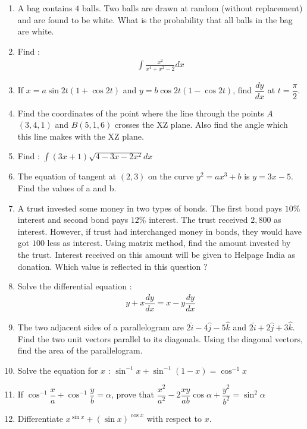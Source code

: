 \documentclass[12pt,-letter paper]{article}
\providecommand{\brak}[1]{\ensuremath{\left(#1\right)}}
\theoremstyle{remark}
\begin{document}
\begin{enumerate}
    \item A bag contains $4$ balls. Two balls are drawn at random (without replacement) and are found to be white. What is the probability that all balls in the bag are white.
    \item Find :
    \begin{align*}
        \int{\frac{x^2}{x^4+x^2-2}}dx
    \end{align*}
    \item If $x = a \sin 2t (1+\cos 2t)$ and $y = b \cos 2t(1-\cos 2t)$, find $\dfrac{dy}{dx}$ at $t = \dfrac{\pi}{2}$.
    \item Find the coordinates of the point where the line through the points $A$\brak{3, 4, 1} and $B$\brak{5, 1, 6 } crosses the $\mathrm{XZ}$ plane. Also find the angle which this line makes with the $\mathrm{XZ}$ plane.
    \item Find : $\int{\brak{3x + 1} \sqrt{4-3x-2x^2}}dx $
    \item The equation of tangent at \brak{2,3} on the curve $y^2=ax^3+b$ is $y=3x-5$. Find the values of a and b.
    \item A trust invested some money in two types of bonds. The first bond pays $10\%$ interest and second bond pays $12\%$ interest. The trust received \rupee $2,800$ as interest. However, if trust had interchanged money in bonds, they would have got \rupee $100$ less as interest. Using matrix method, find the amount invested by the trust. Interest received on this amount will be given to Helpage India as donation. Which value is reflected in this question ?
    \item Solve the differential equation : 
    \begin{align*}
        y+ x\dfrac{dy}{dx} = x- y\dfrac{dy}{dx}
    \end{align*} 
    \item The two adjacent sides of a parallelogram are $2\hat{i} - 4\hat{j}-5\hat{k}$ and $2\hat{i}+2\hat{j}+3\hat{k}$. Find the two unit vectors parallel to its diagonals. Using the diagonal vectors, find the area of the parallelogram.
    \item Solve the equation for $x$ : $\sin^{-1} x+\sin^{-1}(1-x)=\cos^{-1}x$
    
    \item If $\cos^{-1}\dfrac{x}{a}+\cos^{-1}\dfrac{y}{b}=\alpha$, prove that $\dfrac{x^2}{a^2} - 2\dfrac{xy}{ab}\cos\alpha + \dfrac{y^2}{b^2} = \sin^2\alpha$
    \item Differentiate $x^{\sin x} + \brak{\sin x}^{\cos x}$ with respect to $x$.
    

\end{enumerate}
\end{document}
